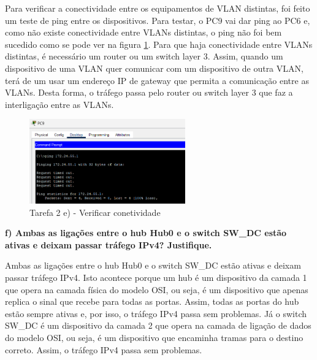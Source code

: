 \documentclass[11pt,english, openright, oneside]{book}
\begin{document}
Para verificar a conectividade entre os equipamentos de VLAN distintas, foi
feito um teste de ping entre os dispositivos. Para testar, o PC9 vai dar ping ao
PC6 e, como não existe conectividade entre VLANs distintas, o ping não foi bem
sucedido como se pode ver na figura \ref{fig:2e}. Para que haja conectividade
entre VLANs distintas, é necessário um router ou um switch layer 3. Assim,
quando um dispositivo de uma VLAN quer comunicar com um dispositivo de outra
VLAN, terá de um usar um endereço IP de gateway que permita a comunicação entre
as VLANs. Desta forma, o tráfego passa pelo router ou switch layer 3 que faz a
interligação entre as VLANs. \par \vspace{0.4cm}

\begin{figure}[H]
    \centering
    \includegraphics[width=0.6\textwidth]{imagens/Tarefa2/2.e.png}
    \caption{Tarefa 2 e) - Verificar conetividade}
    \label{fig:2e}
\end{figure}

\vspace{0.8cm}

\textbf{f) Ambas as ligações entre o hub Hub0 e o switch  SW\_DC estão ativas e deixam passar tráfego IPv4? Justifique.}
\vspace{0.2cm}

Ambas as ligações entre o hub Hub0 e o switch SW\_DC estão ativas e deixam
passar tráfego IPv4. Isto acontece porque um hub é um dispositivo da camada 1
que opera na camada física do modelo OSI, ou seja, é um dispositivo que apenas
replica o sinal que recebe para todas as portas. Assim, todas as portas do hub
estão sempre ativas e, por isso, o tráfego IPv4 passa sem problemas. Já o switch
SW\_DC é um dispositivo da camada 2 que opera na camada de ligação de dados do
modelo OSI, ou seja, é um dispositivo que encaminha tramas para o destino
correto. Assim, o tráfego IPv4 passa sem problemas.

\vspace{0.8cm}

\pagebreak
\end{document}

